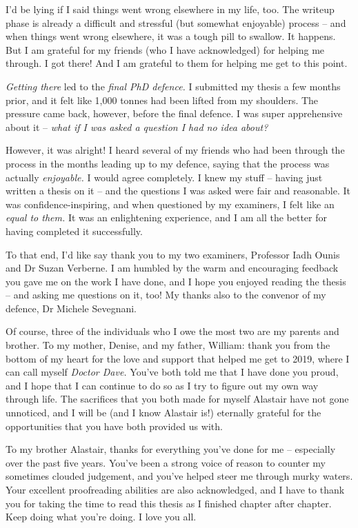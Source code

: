 \begin{preamble}
I'd be lying if I said things went wrong elsewhere in my life, too. The writeup phase is already a difficult and stressful (but somewhat enjoyable) process -- and when things went wrong elsewhere, it was a tough pill to swallow. It happens. But I am grateful for my friends (who I have acknowledged) for helping me through. I got there! And I am grateful to them for helping me get to this point.

\emph{Getting there} led to the \emph{final PhD defence.} I submitted my thesis a few months prior, and it felt like 1,000 tonnes had been lifted from my shoulders. The pressure came back, however, before the final defence. I was super apprehensive about it -- \emph{what if I was asked a question I had no idea about?}

However, it was alright! I heard several of my friends who had been through the process in the months leading up to my defence, saying that the process was actually \emph{enjoyable.} I would agree completely. I knew my stuff -- having just written a thesis on it -- and the questions I was asked were fair and reasonable. It was confidence-inspiring, and when questioned by my examiners, I felt like an \emph{equal to them.} It was an enlightening experience, and I am all the better for having completed it successfully.

To that end, I'd like say thank you to my two examiners, Professor Iadh Ounis and Dr Suzan Verberne. I am humbled by the warm and encouraging feedback you gave me on the work I have done, and I hope you enjoyed reading the thesis -- and asking me questions on it, too! My thanks also to the convenor of my defence, Dr Michele Sevegnani.

Of course, three of the individuals who I owe the most two are my parents and brother. To my mother, Denise, and my father, William: thank you from the bottom of my heart for the love and support that helped me get to 2019, where I can call myself \emph{Doctor Dave.} You've both told me that I have done you proud, and I hope that I can continue to do so as I try to figure out my own way through life. The sacrifices that you both made for myself Alastair have not gone unnoticed, and I will be (and I know Alastair is!) eternally grateful for the opportunities that you have both provided us with.

To my brother Alastair, thanks for everything you've done for me -- especially over the past five years. You've been a strong voice of reason to counter my sometimes clouded judgement, and you've helped steer me through murky waters. Your excellent proofreading abilities are also acknowledged, and I have to thank you for taking the time to read this thesis as I finished chapter after chapter. Keep doing what you're doing. I love you all.


\end{preamble}
